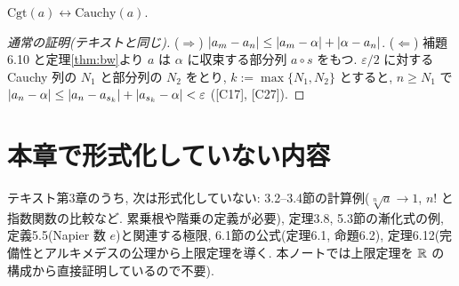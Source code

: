 \begin{thm}
  $\mathrm{Cgt}(a) \leftrightarrow \mathrm{Cauchy}(a)$.
\end{thm}
\begin{proof}[通常の証明(テキストと同じ)]
  ($\Rightarrow$) $\lvert a_m - a_n\rvert \leq \lvert a_m - \alpha\rvert + \lvert \alpha - a_n\rvert$. ($\Leftarrow$) 補題6.10 と定理\ref{thm:bw}より $a$ は $\alpha$ に収束する部分列 $a \circ s$ をもつ. $\varepsilon/2$ に対する Cauchy 列の $N_1$ と部分列の $N_2$ をとり, $k := \max\{N_1, N_2\}$ とすると, $n \geq N_1$ で $\lvert a_n - \alpha\rvert \leq \lvert a_n - a_{s_k}\rvert + \lvert a_{s_k} - \alpha\rvert < \varepsilon$ ([C17], [C27]).
\end{proof}

\section{本章で形式化していない内容}

テキスト第3章のうち, 次は形式化していない: 3.2--3.4節の計算例($\sqrt[n]{a} \to 1$, $n!$ と指数関数の比較など. 累乗根や階乗の定義が必要), 定理3.8, 5.3節の漸化式の例, 定義5.5(Napier 数 $e$)と関連する極限, 6.1節の公式(定理6.1, 命題6.2), 定理6.12(完備性とアルキメデスの公理から上限定理を導く. 本ノートでは上限定理を $\mathbb{R}$ の構成から直接証明しているので不要).
